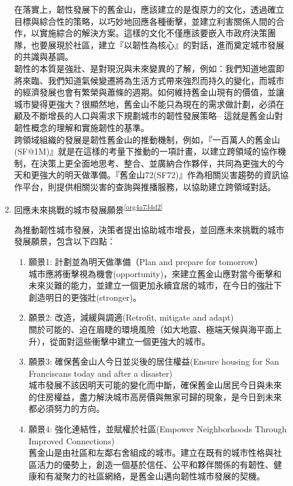 \documentclass[a4paper,12pt]{article}
\begin{document}
\begin{enumerate}
\begin{enumerate}
在落實上，韌性發展下的舊金山，應該建立的是復原力的文化，透過確立目標與綜合性的策略，以巧妙地回應各種衝擊，並建立利害關係人間的合作，以實施綜合的解決方案。這樣的文化不僅應該要嵌入市政府決策團隊，也要展現於社區，建立『以韌性為核心』的對話，進而奠定城市發展的共識與基調。\\

韌性的本質是強壯、是對現況與未來變異的了解，例如：我們知道地震即將來臨、我們知道氣候變遷將為生活方式帶來強烈而持久的變化，而城市的經濟發展也會有繁榮與蕭條的週期。如何維持舊金山現有的價值，並讓城市變得更強大？很顯然地，舊金山不能只為現在的需求做計劃，必須在顧及不斷增長的人口與需求下規劃城市的韌性發展策略– 這就是舊金山對韌性概念的理解和實施韌性的基準。\\

跨領域組織的發展是韌性舊金山的推動機制，例如，『一百萬人的舊金山(SF@1M)』就是在這樣的考量下推動的一項計畫，以建立跨領域的協作機制，在決策上更全面地思考、整合、並廣納合作夥伴，共同為更強大的今天和更強大的明天做準備。『舊金山72(SF72)』作為相關災害趨勢的資訊協作平台，則提供相關災害的查詢與推播服務，以協助建立跨領域對話。\\

\item 回應未來挑戰的城市發展願景\textsuperscript{\ref{org4a734d2}}
\label{sec:org3c30e29}

為推動韌性城市發展，決策者提出協助城市增長，並回應未來挑戰的城市發展願景，包含以下四點：\\
\begin{enumerate}
\item 願景1: 計劃並為明天做準備（Plan and prepare for tomorrow）\\
城市應將衝擊視為機會(opportunity)，來建立舊金山應對當今衝擊和未來災難的能力，並建立一個更加永續宜居的城市，在今日的強壯下創造明日的更強壯(stronger)。\\
\item 願景2: 改造，減緩與調適(Retrofit, mitigate and adapt)\\
關於可能的、迫在眉睫的環境風險（如大地震、極端天候與海平面上升），從面對這些衝擊中建立一個更強大的城市。\\
\item 願景3: 確保舊金山人今日並災後的居住權益(Ensure housing for San Franciscans today and after a disaster)\\
城市發展不該因明天可能的變化而中斷，確保舊金山居民今日與未來的住房權益，盡力解決城市高房價與無家可歸的現象，是今日到未來都必須努力的方向。\\
\item 願景4: 強化連結性，並賦權於社區(Empower Neighborhoods Through Improved Connections)\\
舊金山是由社區和左鄰右舍組成的城市。建立在既有的城市性格與社區活力的優勢上，創造一個基於信任、公平和夥伴關係的有韌性、健康和有凝聚力的社區網絡，是舊金山邁向韌性城市發展的契機。\\
\end{enumerate}


\end{enumerate}
\end{enumerate}
\end{document}
